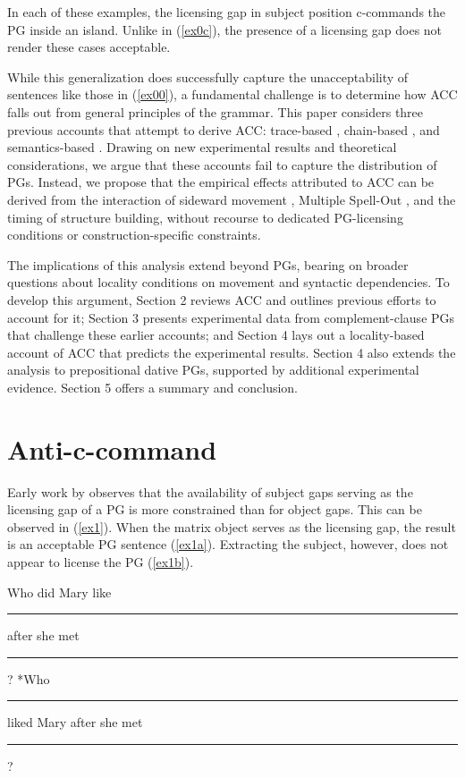 \documentclass[12pt]{article}
\newcommand{\gap}{\rule{1.25em}{.5pt}} %
\begin{document}
In each of these examples, the licensing gap in subject position c-commands the PG inside an island. Unlike in (\ref{ex0c}), the presence of a licensing gap does not render these cases acceptable.

While this generalization does successfully capture the unacceptability of sentences like those in (\ref{ex00}), a fundamental challenge is to determine how ACC falls out from general principles of the grammar. This paper considers three previous accounts that attempt to derive ACC: trace-based \citep{chomsky1981, chomsky1982}, chain-based \citep{nunes2004}, and semantics-based \citep{nissenbaum2000, arregi2022}. Drawing on new experimental results and theoretical considerations, we argue that these accounts fail to capture the distribution of PGs. Instead, we propose that the empirical effects attributed to ACC can be derived from the interaction of sideward movement \citep{nunes2004}, Multiple Spell-Out \citep{uriagereka1999}, and the timing of structure building, without recourse to dedicated PG-licensing conditions or construction-specific constraints.

The implications of this analysis extend beyond PGs, bearing on broader questions about locality conditions on movement and syntactic dependencies. To develop this argument, Section 2 reviews ACC and outlines previous efforts to account for it; Section 3 presents experimental data from complement-clause PGs that challenge these earlier accounts; and Section 4 lays out a locality-based account of ACC that predicts the experimental results. Section 4 also extends the analysis to prepositional dative PGs, supported by additional experimental evidence. Section 5 offers a summary and conclusion.

\section{Anti-c-command}

Early work by \citet{engdahl1983} observes that the availability of subject gaps serving as the licensing gap of a PG is more constrained than for object gaps. This can be observed in (\ref{ex1}). When the matrix object serves as the licensing gap, the result is an acceptable PG sentence (\ref{ex1a}). Extracting the subject, however, does not appear to license the PG (\ref{ex1b}). 

\pex \label{ex1}
\a \label{ex1a} Who did Mary like \gap{} after she met \gap{}?
\a \label{ex1b} *Who \gap{} liked Mary after she met \gap{}?
\xe
\end{document}
